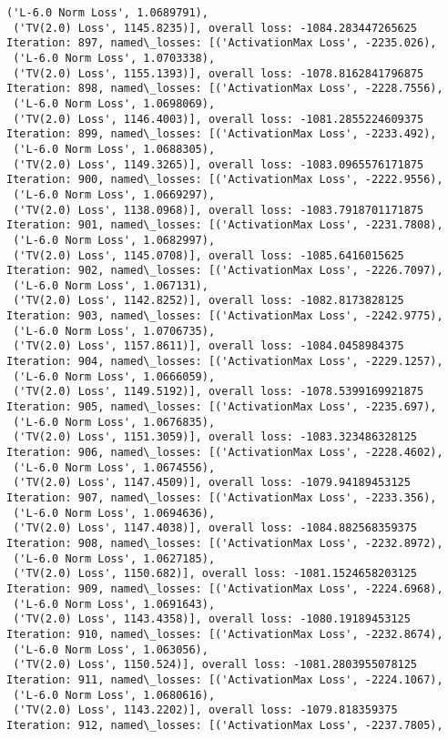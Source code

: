 \documentclass[10pt]{article}
\begin{document}
\begin{Verbatim}[commandchars=\\\{\}]
 ('L-6.0 Norm Loss', 1.0689791),
 ('TV(2.0) Loss', 1145.8235)], overall loss: -1084.283447265625
Iteration: 897, named\_losses: [('ActivationMax Loss', -2235.026),
 ('L-6.0 Norm Loss', 1.0703338),
 ('TV(2.0) Loss', 1155.1393)], overall loss: -1078.8162841796875
Iteration: 898, named\_losses: [('ActivationMax Loss', -2228.7556),
 ('L-6.0 Norm Loss', 1.0698069),
 ('TV(2.0) Loss', 1146.4003)], overall loss: -1081.2855224609375
Iteration: 899, named\_losses: [('ActivationMax Loss', -2233.492),
 ('L-6.0 Norm Loss', 1.0688305),
 ('TV(2.0) Loss', 1149.3265)], overall loss: -1083.0965576171875
Iteration: 900, named\_losses: [('ActivationMax Loss', -2222.9556),
 ('L-6.0 Norm Loss', 1.0669297),
 ('TV(2.0) Loss', 1138.0968)], overall loss: -1083.7918701171875
Iteration: 901, named\_losses: [('ActivationMax Loss', -2231.7808),
 ('L-6.0 Norm Loss', 1.0682997),
 ('TV(2.0) Loss', 1145.0708)], overall loss: -1085.6416015625
Iteration: 902, named\_losses: [('ActivationMax Loss', -2226.7097),
 ('L-6.0 Norm Loss', 1.067131),
 ('TV(2.0) Loss', 1142.8252)], overall loss: -1082.8173828125
Iteration: 903, named\_losses: [('ActivationMax Loss', -2242.9775),
 ('L-6.0 Norm Loss', 1.0706735),
 ('TV(2.0) Loss', 1157.8611)], overall loss: -1084.0458984375
Iteration: 904, named\_losses: [('ActivationMax Loss', -2229.1257),
 ('L-6.0 Norm Loss', 1.0666059),
 ('TV(2.0) Loss', 1149.5192)], overall loss: -1078.5399169921875
Iteration: 905, named\_losses: [('ActivationMax Loss', -2235.697),
 ('L-6.0 Norm Loss', 1.0676835),
 ('TV(2.0) Loss', 1151.3059)], overall loss: -1083.323486328125
Iteration: 906, named\_losses: [('ActivationMax Loss', -2228.4602),
 ('L-6.0 Norm Loss', 1.0674556),
 ('TV(2.0) Loss', 1147.4509)], overall loss: -1079.94189453125
Iteration: 907, named\_losses: [('ActivationMax Loss', -2233.356),
 ('L-6.0 Norm Loss', 1.0694636),
 ('TV(2.0) Loss', 1147.4038)], overall loss: -1084.882568359375
Iteration: 908, named\_losses: [('ActivationMax Loss', -2232.8972),
 ('L-6.0 Norm Loss', 1.0627185),
 ('TV(2.0) Loss', 1150.682)], overall loss: -1081.1524658203125
Iteration: 909, named\_losses: [('ActivationMax Loss', -2224.6968),
 ('L-6.0 Norm Loss', 1.0691643),
 ('TV(2.0) Loss', 1143.4358)], overall loss: -1080.19189453125
Iteration: 910, named\_losses: [('ActivationMax Loss', -2232.8674),
 ('L-6.0 Norm Loss', 1.063056),
 ('TV(2.0) Loss', 1150.524)], overall loss: -1081.2803955078125
Iteration: 911, named\_losses: [('ActivationMax Loss', -2224.1067),
 ('L-6.0 Norm Loss', 1.0680616),
 ('TV(2.0) Loss', 1143.2202)], overall loss: -1079.818359375
Iteration: 912, named\_losses: [('ActivationMax Loss', -2237.7805),

\end{Verbatim}
\end{document}
